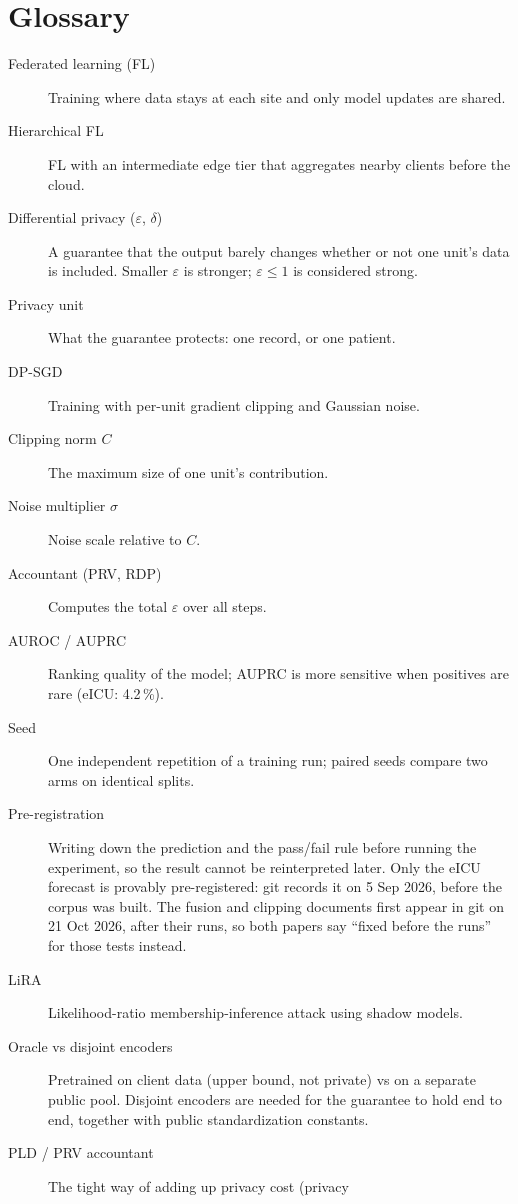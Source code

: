 \documentclass[11pt,a4paper]{article}
\begin{document}
\section{Glossary}
\begin{description}
\item[Federated learning (FL)] Training where data stays at each site and only
model updates are shared.
\item[Hierarchical FL] FL with an intermediate edge tier that aggregates nearby
clients before the cloud.
\item[Differential privacy ($\varepsilon$, $\delta$)] A guarantee that the output
barely changes whether or not one unit's data is included. Smaller
$\varepsilon$ is stronger; $\varepsilon \le 1$ is considered strong.
\item[Privacy unit] What the guarantee protects: one record, or one patient.
\item[DP-SGD] Training with per-unit gradient clipping and Gaussian noise.
\item[Clipping norm $C$] The maximum size of one unit's contribution.
\item[Noise multiplier $\sigma$] Noise scale relative to $C$.
\item[Accountant (PRV, RDP)] Computes the total $\varepsilon$ over all steps.
\item[AUROC / AUPRC] Ranking quality of the model; AUPRC is more sensitive
when positives are rare (eICU: 4.2\,\%).
\item[Seed] One independent repetition of a training run; paired seeds compare
two arms on identical splits.
\item[Pre-registration] Writing down the prediction and the pass/fail rule
before running the experiment, so the result cannot be reinterpreted later.
Only the eICU forecast is provably pre-registered: git records it on 5 Sep
2026, before the corpus was built. The fusion and clipping documents first
appear in git on 21 Oct 2026, after their runs, so both papers say ``fixed
before the runs'' for those tests instead.
\item[LiRA] Likelihood-ratio membership-inference attack using shadow models.
\item[Oracle vs disjoint encoders] Pretrained on client data (upper bound, not
private) vs on a separate public pool. Disjoint encoders are needed for the
guarantee to hold end to end, together with public standardization constants.
\item[PLD / PRV accountant] The tight way of adding up privacy cost (privacy

\end{description}
\end{document}
